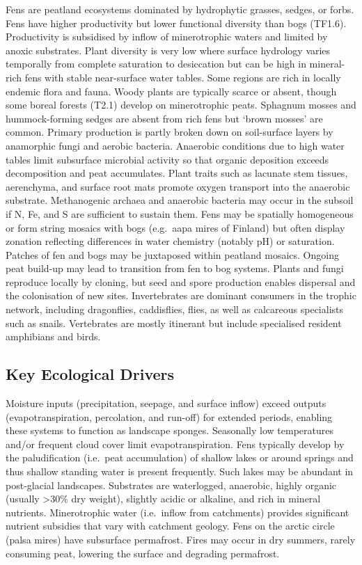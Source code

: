 \documentclass[
  letterpaper,
  DIV=11,
  numbers=noendperiod]{scrartcl}
\begin{document}
Fens are peatland ecosystems dominated by hydrophytic grasses, sedges,
or forbs. Fens have higher productivity but lower functional diversity
than bogs (TF1.6). Productivity is subsidised by inflow of minerotrophic
waters and limited by anoxic substrates. Plant diversity is very low
where surface hydrology varies temporally from complete saturation to
desiccation but can be high in mineral-rich fens with stable
near-surface water tables. Some regions are rich in locally endemic
flora and fauna. Woody plants are typically scarce or absent, though
some boreal forests (T2.1) develop on minerotrophic peats. Sphagnum
mosses and hummock-forming sedges are absent from rich fens but `brown
mosses' are common. Primary production is partly broken down on
soil-surface layers by anamorphic fungi and aerobic bacteria. Anaerobic
conditions due to high water tables limit subsurface microbial activity
so that organic deposition exceeds decomposition and peat accumulates.
Plant traits such as lacunate stem tissues, aerenchyma, and surface root
mats promote oxygen transport into the anaerobic substrate. Methanogenic
archaea and anaerobic bacteria may occur in the subsoil if N, Fe, and S
are sufficient to sustain them. Fens may be spatially homogeneous or
form string mosaics with bogs (e.g.~aapa mires of Finland) but often
display zonation reflecting differences in water chemistry (notably pH)
or saturation. Patches of fen and bogs may be juxtaposed within peatland
mosaics. Ongoing peat build-up may lead to transition from fen to bog
systems. Plants and fungi reproduce locally by cloning, but seed and
spore production enables dispersal and the colonisation of new sites.
Invertebrates are dominant consumers in the trophic network, including
dragonflies, caddisflies, flies, as well as calcareous specialists such
as snails. Vertebrates are mostly itinerant but include specialised
resident amphibians and birds.

\subsection{Key Ecological Drivers}\label{key-ecological-drivers-109}

Moisture inputs (precipitation, seepage, and surface inflow) exceed
outputs (evapotranspiration, percolation, and run-off) for extended
periods, enabling these systems to function as landscape sponges.
Seasonally low temperatures and/or frequent cloud cover limit
evapotranspiration. Fens typically develop by the paludification
(i.e.~peat accumulation) of shallow lakes or around springs and thus
shallow standing water is present frequently. Such lakes may be abundant
in post-glacial landscapes. Substrates are waterlogged, anaerobic,
highly organic (usually \textgreater30\% dry weight), slightly acidic or
alkaline, and rich in mineral nutrients. Minerotrophic water
(i.e.~inflow from catchments) provides significant nutrient subsidies
that vary with catchment geology. Fens on the arctic circle (palsa
mires) have subsurface permafrost. Fires may occur in dry summers,
rarely consuming peat, lowering the surface and degrading permafrost.
\end{document}
